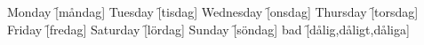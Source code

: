 \begin{questions}
    \begin{multicols}{2}
        \raggedcolumns
        \question Monday \f[måndag]
        \question Tuesday \f[tisdag]
        \question Wednesday \f[onsdag]
        \question Thursday \f[torsdag]
        \question Friday \f[fredag]
        \question Saturday \f[lördag]
        \question Sunday \f[söndag]
        \question bad \f[dålig,dåligt,dåliga]
    \end{multicols}
\end{questions}